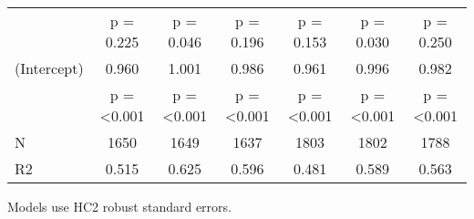 \begin{table}[!h]
\begin{threeparttable}
{\begin{tabular}[t]{lcccccc}
 & p = \num{0.225} & p = \num{0.046} & p = \num{0.196} & p = \num{0.153} & p = \num{0.030} & p = \num{0.250}\\
(Intercept) & \num{0.960} & \num{1.001} & \num{0.986} & \num{0.961} & \num{0.996} & \num{0.982}\\
 & p = \num{<0.001} & p = \num{<0.001} & p = \num{<0.001} & p = \num{<0.001} & p = \num{<0.001} & p = \num{<0.001}\\
\midrule
N & \num{1650} & \num{1649} & \num{1637} & \num{1803} & \num{1802} & \num{1788}\\
R2 & \num{0.515} & \num{0.625} & \num{0.596} & \num{0.481} & \num{0.589} & \num{0.563}\\
\bottomrule
\end{tabular}}
\begin{tablenotes}
\item Models use HC2 robust standard errors.
\end{tablenotes}
\end{threeparttable}
\end{table}
